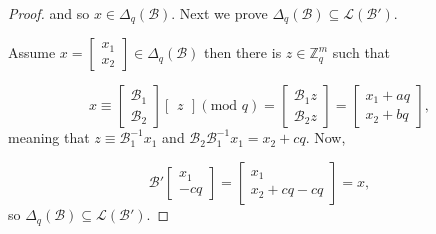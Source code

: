 \documentclass[11pt]{article}
\theoremstyle{definition}
\theoremstyle{plain}
\theoremstyle{remark}
\newcommand{\LL}{\mathcal{L}}
\newcommand{\cB}{\mathcal{B}}
\newcommand{\bZ}{\mathbb{Z}}
\begin{document}
\begin{proof}

and so $x \in \Delta_q(\cB)$. Next we prove $\Delta_q(\cB) \subseteq \LL(\cB')$.

Assume $x = \begin{bmatrix}x_1 \\ x_2 \end{bmatrix}\in \Delta_q(\cB)$ then there is $z \in \bZ_q^m$ such that  

$$x \equiv \begin{bmatrix}
\cB_1\\
\cB_2
\end{bmatrix}
\begin{bmatrix}
z
\end{bmatrix}
(\text{mod } q)
= \begin{bmatrix}
\cB_1 z\\
\cB_2 z
\end{bmatrix}
= \begin{bmatrix}
x_1 + aq\\
x_2 + bq
\end{bmatrix},$$
meaning that $ z \equiv \cB_1^{-1}x_1$ and $\cB_2\cB_1^{-1}x_1 = x_2 + cq$. Now,

$$\cB' \begin{bmatrix}
x_1\\
-cq
\end{bmatrix}
=\begin{bmatrix}
x_1\\
x_2 + cq - cq
\end{bmatrix} = x,$$
so $\Delta_q(\cB) \subseteq \LL(\cB')$.
\end{proof}
\end{document}
